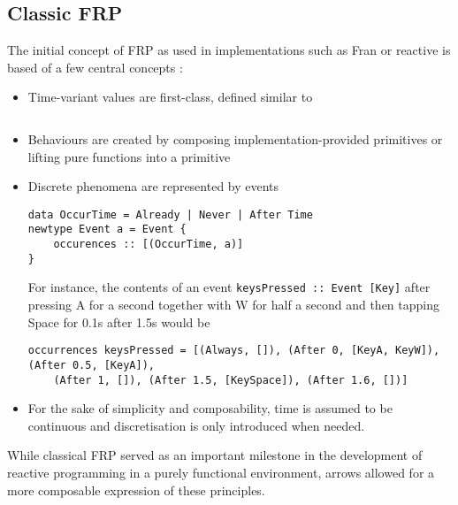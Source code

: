 \documentclass[pdftex,a4paper]{extarticle}
\begin{document}
\subsection{Classic FRP}
The initial concept of FRP as used in implementations such as Fran \cite{ElliottHudak97:Fran} or reactive \cite{haskell-wiki-reactive} is based of a few central concepts \cite{conal-what-is-frp,Elliott2009-push-pull-frp}:
\begin{itemize}
\item Time-variant values are first-class, defined similar to \cite{haskell-wiki-frp}
\inputminted{haskell}{Behaviour.hs}
\item Behaviours are created by composing implementation-provided primitives or lifting pure functions into a primitive
\item Discrete phenomena are represented by events

\begin{verbatim}
data OccurTime = Already | Never | After Time
newtype Event a = Event {
    occurences :: [(OccurTime, a)]
}
\end{verbatim}
For instance, the contents of an event \texttt{keysPressed :: Event [Key]} after pressing A for a second together with W for half a second and then tapping Space for 0.1s after 1.5s would be
\begin{verbatim}
occurrences keysPressed = [(Always, []), (After 0, [KeyA, KeyW]), (After 0.5, [KeyA]), 
    (After 1, []), (After 1.5, [KeySpace]), (After 1.6, [])]
\end{verbatim}

\item For the sake of simplicity and composability, time is assumed to be continuous and discretisation is only introduced when needed.
\end{itemize}

While classical FRP served as an important milestone in the development of reactive programming in a purely functional environment, arrows allowed for a more composable expression of these principles.
\end{document}
